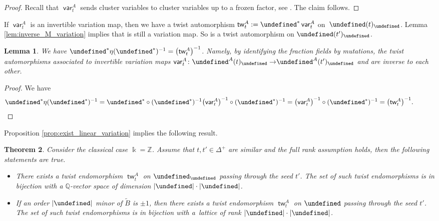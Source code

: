 \documentclass[10pt,a4paper]{amsart}
\newcommand{\kk}{\Bbbk}
\newcommand{\Z}{\mathbb{Z}}
\newcommand{\Q}{\mathbb{Q}}
\renewcommand{\tilde}[1]{\widetilde{#1}}
\newcommand{\opname}[1]{\operatorname{\mathsf{#1}}}
\newcommand{\tB}{{\widetilde{B}}}
\newcommand{\tw}{{\tilde{w}}}
\newcommand{\var}{\opname{var}}
\newcommand{\fv}{\opname{f}}
\newcommand{\ufv}{\opname{uf}}
\let\Iufv\undefined
\let\Ifv\undefined
\let\upClAlg\undefined
\let\LP\undefined
\let\fFac\undefined
\let\fFacRoot\undefined
\let\seq\undefined
\renewcommand{\tw}{\opname{tw}}
\newcommand{\Iufv}{I_{\ufv}}
\newcommand{\Ifv}{I_{\fv}}
\newcommand{\upClAlg}{\mathcal{U}^A}
\newcommand{\LP}{{\mathcal{LP}}}
\newcommand{\fFac}{\mathcal{Z}}
\newcommand{\fFacRoot}{\fFac^{\Q}}
\newcommand{\seq}{\boldsymbol{\mu}}%
\renewcommand{\tw}{\opname{tw}}
\numberwithin{equation}{section}
\newtheorem{Theorem}{Theorem}[section]
\newtheorem{Lemma}[Theorem]{Lemma}
\begin{document}
\begin{proof}
Recall that $\var_{t}^{A}$ sends cluster variables to cluster
variables up to a frozen factor, see \cite[Lemma 4.2.2]{qin2017triangular}.
The claim follows.
\end{proof}

If $\var_{t}^{A}$ is an invertible variation map, then we have a
twist automorphism $\tw_{t}^{A}:=\seq^{*}\var_{t}^{A}$ on~$\upClAlg(t)_{\fFacRoot}$.
Lemma \ref{lem:inverse_M_variation} implies that \smash{$\bigl(\var_{t}^{A}\bigr)^{-1}$}
is still a variation map. So \smash{$\eta:=(\seq^{*})^{-1}\bigl(\var_{t}^{A}\bigr)^{-1}$}
is a twist automorphism on $\upClAlg(t')_{\fFacRoot}$.

\begin{Lemma}\label{lem:inverse_A_twist_automorphism}
We have $\seq^{*}\eta(\seq^{*})^{-1}=\bigl(\tw_{t}^{A}\bigr)^{-1}$. Namely,
by identifying the fraction fields by mutations, the twist automorphisms
associated to invertible variation maps $\smash{\var_{t}^{A}\colon\LP^{A}(t)_{\fFacRoot}\rightarrow}\allowbreak\LP^{A}(t')_{\fFacRoot}$
and \smash{$\bigl(\var_{t}^{A}\bigr)^{-1}\colon\LP^{A}(t')_{\fFacRoot}\rightarrow\LP^{A}(t)_{\fFacRoot}$} are inverse
to each other.
\end{Lemma}

\begin{proof}
We have
\begin{align*}
\seq^{*}\eta(\seq^{*})^{-1} & =\seq^{*}\circ(\seq^{*})^{-1}\bigl(\var_{t}^{A}\bigr)^{-1}\circ(\seq^{*})^{-1} =\bigl(\var_{t}^{A}\bigr)^{-1}\circ(\seq^{*})^{-1} =\bigl(\tw_{t}^{A}\bigr)^{-1}.\tag*{\qed}
\end{align*} \renewcommand{\qed}{}
\end{proof}

Proposition \ref{prop:exist_linear_variation} implies the following
result.

\begin{Theorem}\label{thm:twist_A}
Consider the classical case $\kk=\Z$. Assume that $t,t'\in\Delta^{+}$ are similar and the full rank assumption
holds, then the following statements are true.
\begin{itemize}\itemsep=0pt
\item[$(1)$] There exists a twist endomorphism $\tw_{t}^{A}$ on $\upClAlg_{\fFacRoot}$
passing through the seed $t'$. The set of such twist endomorphisms
is in bijection with a $\Q$-vector space of dimension $|\Iufv|\cdot|\Ifv|$.
\item[$(2)$] If an order $|\Iufv|$ minor of $\tB$ is $\pm1$, then there
exists a twist endomorphism $\tw_{t}^{A}$ on $\upClAlg$ passing
through the seed $t'$. The set of such twist endomorphisms is in
bijection with a~lattice of rank $|\Iufv|\cdot|\Ifv|$.
\end{itemize}
\end{Theorem}
\end{document}
